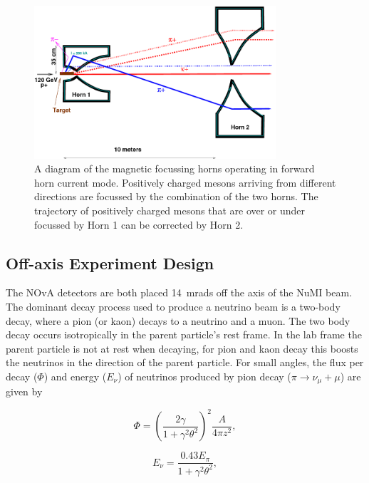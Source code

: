 \begin{figure}
  \centering
  \includegraphics[width=0.8\textwidth]{../../img/beam/images_pion_tracks_in_horn.png}  
  \caption{
    A diagram of the magnetic focussing horns operating in forward
    horn current 
    mode. Positively charged mesons arriving from different directions
    are focussed by the combination of the two horns. The trajectory of
    positively charged mesons that are over or under focussed by Horn
    1 can be corrected by Horn 2. \cite{NuMI}
  }
  \label{fig:horn}
\end{figure}


\subsection{Off-axis Experiment Design}

The NOvA detectors are both placed 14~mrads off the axis of the NuMI
beam.
The dominant decay process used to produce a neutrino beam is a
two-body decay, where a
pion (or kaon) decays to a neutrino and a muon. The two body decay 
occurs isotropically in the parent particle's rest frame. 
In the lab frame the parent particle is not at rest when decaying, for
pion and kaon decay this boosts the neutrinos in the
direction of the parent particle.
For small angles, the flux per decay ($\Phi$) and energy ($E_\nu$) of
neutrinos produced by pion decay ($\pi \rightarrow \nu_{\mu} + \mu$)
are given by 

\begin{equation}
\Phi = \left( \dfrac{2\gamma}{1+\gamma^2 \theta^2} \right)^2 \dfrac{A}{4\pi z^2},
\label{eqn:NuPiFlux}
\end{equation}

\begin{equation}
E_{\nu} = \dfrac{0.43E_{\pi}}{1+\gamma^2\theta^2},
\label{eqn:NuPiEnrgy}
\end{equation}


